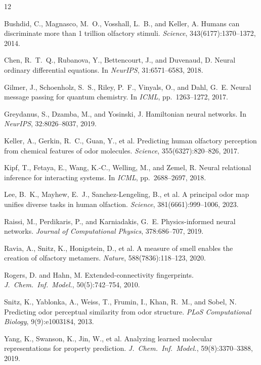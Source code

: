 \documentclass[11pt,a4paper]{article}
\begin{document}
\begin{thebibliography}{12}

Bushdid, C., Magnasco, M.~O., Vosshall, L.~B., and Keller, A.
\newblock Humans can discriminate more than 1 trillion olfactory stimuli.
\newblock \textit{Science}, 343(6177):1370--1372, 2014.

Chen, R.~T.~Q., Rubanova, Y., Bettencourt, J., and Duvenaud, D.
\newblock Neural ordinary differential equations.
\newblock In \textit{NeurIPS}, 31:6571--6583, 2018.

Gilmer, J., Schoenholz, S.~S., Riley, P.~F., Vinyals, O., and Dahl, G.~E.
\newblock Neural message passing for quantum chemistry.
\newblock In \textit{ICML}, pp.~1263--1272, 2017.

Greydanus, S., Dzamba, M., and Yosinski, J.
\newblock Hamiltonian neural networks.
\newblock In \textit{NeurIPS}, 32:8026--8037, 2019.

Keller, A., Gerkin, R.~C., Guan, Y., et al.
\newblock Predicting human olfactory perception from chemical features of odor molecules.
\newblock \textit{Science}, 355(6327):820--826, 2017.

Kipf, T., Fetaya, E., Wang, K.-C., Welling, M., and Zemel, R.
\newblock Neural relational inference for interacting systems.
\newblock In \textit{ICML}, pp.~2688--2697, 2018.

Lee, B.~K., Mayhew, E.~J., Sanchez-Lengeling, B., et al.
\newblock A principal odor map unifies diverse tasks in human olfaction.
\newblock \textit{Science}, 381(6661):999--1006, 2023.

Raissi, M., Perdikaris, P., and Karniadakis, G.~E.
\newblock Physics-informed neural networks.
\newblock \textit{Journal of Computational Physics}, 378:686--707, 2019.

Ravia, A., Snitz, K., Honigstein, D., et al.
\newblock A measure of smell enables the creation of olfactory metamers.
\newblock \textit{Nature}, 588(7836):118--123, 2020.

Rogers, D. and Hahn, M.
\newblock Extended-connectivity fingerprints.
\newblock \textit{J.~Chem.~Inf.~Model.}, 50(5):742--754, 2010.

Snitz, K., Yablonka, A., Weiss, T., Frumin, I., Khan, R.~M., and Sobel, N.
\newblock Predicting odor perceptual similarity from odor structure.
\newblock \textit{PLoS Computational Biology}, 9(9):e1003184, 2013.

Yang, K., Swanson, K., Jin, W., et al.
\newblock Analyzing learned molecular representations for property prediction.
\newblock \textit{J.~Chem.~Inf.~Model.}, 59(8):3370--3388, 2019.

\end{thebibliography}
\end{document}
